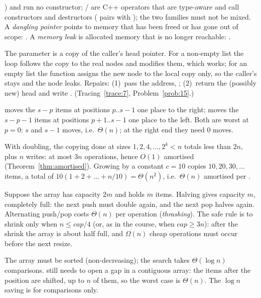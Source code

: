 \begin{questions}
  ) and run no constructor; / are C++ operators that are
  type-aware and call constructors and destructors ( pairs with );
  the two families must not be mixed. A \emph{dangling pointer} points to memory that has
  been freed or has gone out of scope:
    . A
  \emph{memory leak} is allocated memory that is no longer reachable:
   .
\item The parameter  is a copy of the caller's head pointer. For a non-empty list
  the loop follows the copy to the real nodes and modifies them, which works; for an
  empty list the function assigns the new node to the local copy only, so the caller's
   stays  and the node leaks. Repairs: (1)~pass the address,
  ; (2)~return the (possibly new) head and write
  . (Tracing~\ref{trace:7}, Problem~\ref{prob:15}.)
\item {} moves the $s-p$ items at positions $p..s-1$ one place to the
  right;  moves the $s-p-1$ items at positions $p+1..s-1$ one place to the
  left. Both are worst at $p=0$: $s$ and $s-1$ moves, i.e.\ $\Theta(n)$; at the right end
  they need $0$ moves.
\item With doubling, the copying done at sizes $1,2,4,\dots,2^k<n$ totals less than $2n$,
  plus $n$ writes: at most $3n$ operations, hence $O(1)$ amortised
  (Theorem~\ref{thm:amortised}). Growing by a constant $c=10$ copies $10,20,30,\dots$
  items, a total of $10(1+2+\dots+n/10)=\Theta(n^2)$, i.e.\ $\Theta(n)$ amortised per
  .
\item Suppose the array has capacity $2m$ and holds $m$ items. Halving gives capacity
  $m$, completely full: the next push must double again, and the next pop halves again.
  Alternating push/pop costs $\Theta(n)$ per operation (\emph{thrashing}). The safe rule
  is to shrink only when $n\le\mathit{cap}/4$ (or, as in the course, when
  $\mathit{cap}\ge3n$): after the shrink the array is about half full, and $\Omega(n)$
  cheap operations must occur before the next resize.
\item The array must be sorted (non-decreasing); the search takes $\Theta(\log n)$
  comparisons.  still needs to open a gap in a contiguous array: the items
  after the position are shifted, up to $n$ of them, so the worst case is $\Theta(n)$.
  The $\log n$ saving is for comparisons only.

\end{questions}
